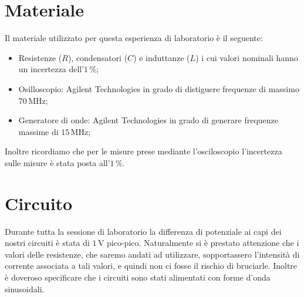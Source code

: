 \section*{Materiale}

Il materiale utilizzato per questa esperienza di laboratorio è il seguente:

\begin{itemize}
	\item{Resistenze ($R$), condensatori ($C$) e induttanze ($L$) i cui valori nominali hanno un incertezza dell'$1\,\%$;}
	\item{Osilloscopio: Agilent Technologies in grado di distiguere frequenze di massimo $70\,\si{\mega\hertz}$;}
	\item{Generatore di onde: Agilent Technologies in grado di generare frequenze massime di $15\,\si{\mega\hertz}$;}
\end{itemize}

Inoltre ricordiamo che per le misure prese mediante l'osciloscopio l'incertezza sulle misure è stata posta all'$1\,\%$.

\section*{Circuito}

Durante tutta la sessione di laboratorio la differenza di potenziale ai capi dei nostri circuiti è stata di $1\,\si{\volt}$ pico-pico. Naturalmente si è prestato attenzione che i valori delle resistenze, che saremo andati ad utilizzare, sopportassero l'intensità di corrente associata a tali valori, e quindi non ci fosse il rischio di bruciarle. Inoltre è doveroso specificare che i circuiti sono stati alimentati con forme d'onda sinusoidali.

